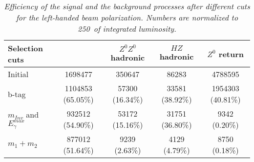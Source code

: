 \begin{table}
        \begin{center}
        \begin{tabular}{l c c c c}
        \hline
	Selection cuts 					& \bbbar 			& $Z^0Z^0$ hadronic & $HZ$ hadronic 	&  $Z^0$ return   \\
	\hline
	Initial 							& 1698477 			& 350647 			& 86283 			& 4788595 \\
	b-tag  							& 1104853 (65.05\%) & 57300 (16.34\%) 	& 33581 (38.92\%) 	& 1954303 (40.81\%) \\
	$m_{Inv}$ and $E_\gamma^{max}$  	& 932512 (54.90\%) 	& 53172 (15.16\%) 	& 31751 (36.80\%) 	& 9342 (0.20\%) \\
	$m_1+m_2$  						& 877012 (51.64\%) 	& 9239 (2.63\%) 	& 4129 (4.79\%) 	& 8750 (0.18\%) \\
        \hline
        \end{tabular}
        \end{center}
        \caption{\sl Efficiency of the signal and the background processes after different cuts for the left-handed beam polarization. Numbers are normalized to 250\ifb\ of integrated luminosity.}
        \label{table:bbbarselection} %
\end{table}
